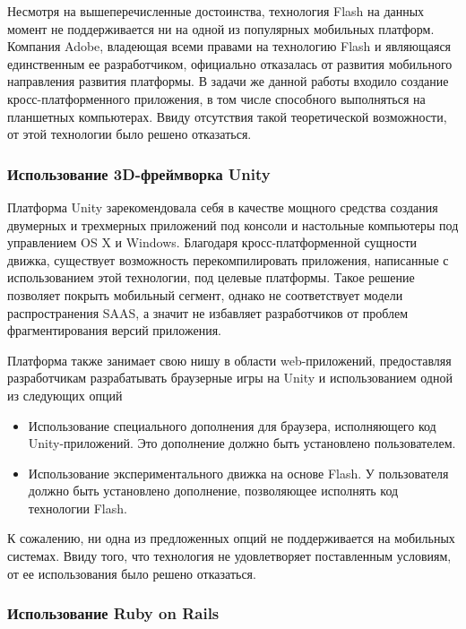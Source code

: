 Несмотря на вышеперечисленные достоинства, технология Flash на данных момент не
поддерживается ни на одной из популярных мобильных платформ. Компания Adobe,
владеющая всеми правами на технологию Flash и являющаяся единственным ее
разработчиком, официально отказалась от развития мобильного направления развития
платформы. В задачи же данной работы входило создание кросс-платформенного
приложения, в том числе способного выполняться на планшетных компьютерах. Ввиду
отсутствия такой теоретической возможности, от этой технологии было решено
отказаться.

\subsubsection{Использование 3D-фреймворка Unity}

Платформа Unity зарекомендовала себя в качестве мощного средства создания
двумерных и трехмерных приложений под консоли и настольные компьютеры под
управлением OS X и Windows. Благодаря кросс-платформенной сущности движка,
существует возможность перекомпилировать приложения, написанные с использованием
этой технологии, под целевые платформы. Такое решение позволяет покрыть
мобильный сегмент, однако не соответствует модели распространения SAAS, а значит
не избавляет разработчиков от проблем фрагментирования версий приложения.

Платформа также занимает свою нишу в области web-приложений, предоставляя
разработчикам разрабатывать браузерные игры на Unity и использованием одной из
следующих опций

\begin{itemize}
    \item Использование специального дополнения для браузера, исполняющего код
    Unity-приложений. Это дополнение должно быть установлено пользователем.
    \item Использование экспериментального движка на основе Flash. У
    пользователя должно быть установлено дополнение, позволяющее исполнять код
    технологии Flash.
\end{itemize}

К сожалению, ни одна из предложенных опций не поддерживается на мобильных
системах.  Ввиду того, что технология не удовлетворяет поставленным условиям,
от ее использования было решено отказаться.

\subsubsection{Использование Ruby on Rails}

